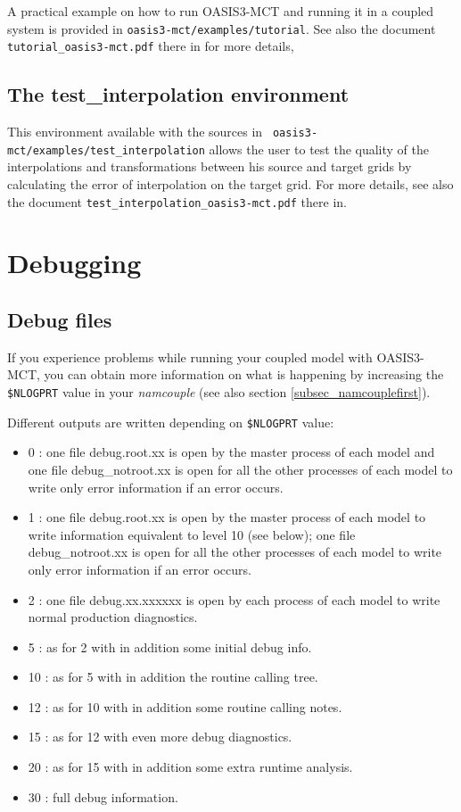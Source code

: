 A practical example on how to run OASIS3-MCT and running it in a
coupled system is provided in {\tt oasis3-mct/examples/tutorial}. See also the document {\tt tutorial\_oasis3-mct.pdf} there in for
more details,

\subsection{The test\_interpolation environment}
\label{subsec_testinterpolation}

This environment available with the sources in {\tt
  oasis3-mct/examples/test\_interpolation} allows the user to test the
quality of the interpolations and transformations between his source
and target grids by calculating the error of interpolation on the
target grid. For more details, see also the document {\tt test\_interpolation\_oasis3-mct.pdf} there in.

\section{Debugging}
\label{subsec_debug}

\subsection{Debug files}
If you experience problems while running your coupled model with
OASIS3-MCT, you can obtain more information on what is happening by
increasing the {\tt \$NLOGPRT} value in your {\it namcouple} (see also section
\ref{subsec_namcouplefirst}).

Different outputs are written depending on {\tt \$NLOGPRT} value:
\begin{itemize}
\item {0} : one file debug.root.xx is open by the master process of
  each model and one file debug\_notroot.xx is open for all the other
  processes of each model to write only error information if an error
  occurs.
\item {1} : one file debug.root.xx is open by the master process of
  each model to write information equivalent to level 10 (see below);
  one file debug\_notroot.xx is open for all the other processes of
  each model to write only error information if an error occurs.
\item {2} : one file debug.xx.xxxxxx is open by each process of each
  model to write normal production diagnostics.
\item {5} : as for 2 with in addition some initial debug info.
\item {10} : as for 5 with in addition the routine calling tree.
\item {12} : as for 10 with in addition some routine calling notes.
\item {15} : as for 12 with even more debug diagnostics.
\item {20} : as for 15 with in addition some extra runtime analysis.
\item {30} : full debug information.
\end{itemize}

